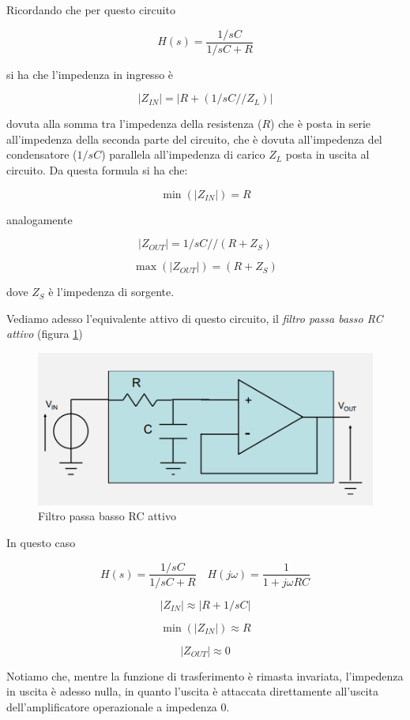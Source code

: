 \documentclass{article}
\begin{document}
Ricordando che per questo circuito

\[H(s) = \frac{1/sC}{1/sC + R}\]

si ha che l'impedenza in ingresso è

\[|Z_{IN}|=|R + (1/sC // Z_L)|\]

dovuta alla somma tra l'impedenza della resistenza ($R$) che è posta in serie all'impedenza della seconda parte del circuito, che è dovuta all'impedenza del condensatore ($1/sC$) parallela all'impedenza di carico $Z_L$ posta in uscita al circuito. Da questa formula si ha che:

\[\min(|Z_{IN}|) = R\]

analogamente

\[|Z_{OUT}|= 1/sC // (R + Z_S)\]

\[\max(|Z_{OUT}|) = (R + Z_S)\]

dove $Z_S$ è l'impedenza di sorgente.

\clearpage

Vediamo adesso l'equivalente attivo di questo circuito, il \textit{filtro passa basso RC attivo} (figura \ref{Schema_filtro_passa_basso_RC_attivo})

\begin{figure}[h]
  \centering
  \includegraphics[scale=0.7]{IM_filtro_passa_basso_RC_attivo}
  \caption{Filtro passa basso RC attivo}
  \label{Schema_filtro_passa_basso_RC_attivo}
\end{figure}

In questo caso 

\[H(s) = \frac{1/sC}{1/sC + R} \quad H(j \omega) = \frac{1}{1 + j \omega RC}\]

\[|Z_{IN}| \approx |R + 1/sC|\]

\[\min(|Z_{IN}|) \approx R\]

\[|Z_{OUT}| \approx 0\]

Notiamo che, mentre la funzione di trasferimento è rimasta invariata, l'impedenza in uscita è adesso nulla, in quanto l'uscita è attaccata direttamente all'uscita dell'amplificatore operazionale a impedenza 0.
\end{document}
